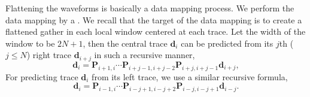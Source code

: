 
Flattening the waveforms is basically a data mapping process. We perform the data mapping by a . We recall that the target of the data mapping is to create a flattened gather in each local window centered at each trace. Let the width of the window to be $2N+1$, then the central trace $\mathbf{d}_i$ can be predicted from its $j$th ($j\le N$) right trace $\mathbf{d}_{i+j}$ in such a recursive manner,
\begin{equation}
\label{eq:recur}
\mathbf{d}_i=\mathbf{P}_{i+1,i}\cdots\mathbf{P}_{i+j-1,i+j-2}\mathbf{P}_{i+j,i+j-1}\mathbf{d}_{i+j}, 
\end{equation}
 For predicting trace $\mathbf{d}_i$ from its left trace, we use a similar recursive formula,
\begin{equation}
\label{eq:recur}
\mathbf{d}_i=\mathbf{P}_{i-1,i}\cdots\mathbf{P}_{i-j+1,i-j+2}\mathbf{P}_{i-j,i-j+1}\mathbf{d}_{i-j}. 
\end{equation}

